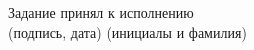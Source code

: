 \begin{titlepage}
\begin{flushleft}
        Задание принял к исполнению \hspace{0.2cm}\underline{\hspace{5cm}}
            \hspace{0.5cm} \underline{\hspace{4.2cm}}\\
            \vspace{-0.2cm}\hspace{8cm}\footnotesize(подпись, дата)
            \hspace{3cm}(инициалы и фамилия)\normalsize\\
    \end{flushleft}
\end{titlepage}
\setcounter{page}{3}